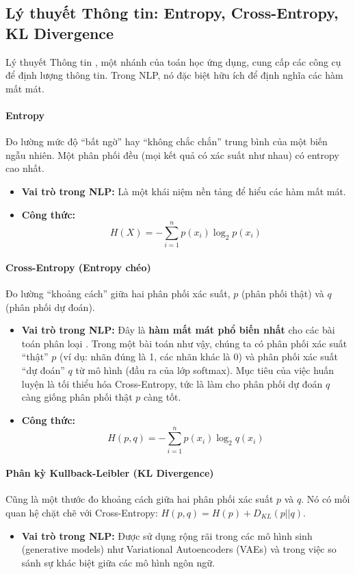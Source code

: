 \subsection{Lý thuyết Thông tin: Entropy, Cross-Entropy, KL Divergence}
\label{ssec:ly_thuyet_thong_tin}
Lý thuyết Thông tin \cite{shannon1948mathematical}, một nhánh của toán học ứng dụng, cung cấp các công cụ để định lượng thông tin. Trong NLP, nó đặc biệt hữu ích để định nghĩa các hàm mất mát.

\paragraph{Entropy}
Đo lường mức độ “bất ngờ” hay “không chắc chắn” trung bình của một biến ngẫu nhiên. Một phân phối đều (mọi kết quả có xác suất như nhau) có entropy cao nhất.
\begin{itemize}
    \item \textbf{Vai trò trong NLP:} Là một khái niệm nền tảng để hiểu các hàm mất mát.
    \item \textbf{Công thức:}
        \begin{equation}
            H(X) = -\sum_{i=1}^{n} p(x_i) \log_2 p(x_i)
            \label{eq:entropy}
        \end{equation}
\end{itemize}

\paragraph{Cross-Entropy (Entropy chéo)}
Đo lường “khoảng cách” giữa hai phân phối xác suất, $p$ (phân phối thật) và $q$ (phân phối dự đoán).
\begin{itemize}
    \item \textbf{Vai trò trong NLP:} Đây là \textbf{hàm mất mát phổ biến nhất} cho các bài toán phân loại \cite{goodfellow2016deep}. Trong một bài toán như vậy, chúng ta có phân phối xác suất “thật” $p$ (ví dụ: nhãn đúng là 1, các nhãn khác là 0) và phân phối xác suất “dự đoán” $q$ từ mô hình (đầu ra của lớp softmax). Mục tiêu của việc huấn luyện là tối thiểu hóa Cross-Entropy, tức là làm cho phân phối dự đoán $q$ càng giống phân phối thật $p$ càng tốt.
    \item \textbf{Công thức:}
        \begin{equation}
            H(p, q) = -\sum_{i=1}^{n} p(x_i) \log_2 q(x_i)
            \label{eq:cross_entropy}
        \end{equation}
\end{itemize}

\paragraph{Phân kỳ Kullback-Leibler (KL Divergence)}
Cũng là một thước đo khoảng cách giữa hai phân phối xác suất $p$ và $q$. Nó có mối quan hệ chặt chẽ với Cross-Entropy: $H(p, q) = H(p) + D_{KL}(p || q)$.
\begin{itemize}
    \item \textbf{Vai trò trong NLP:} Được sử dụng rộng rãi trong các mô hình sinh (generative models) như Variational Autoencoders (VAEs) và trong việc so sánh sự khác biệt giữa các mô hình ngôn ngữ.
\end{itemize}